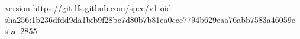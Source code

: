 version https://git-lfs.github.com/spec/v1
oid sha256:1b236dfdd9da1bfb9f28bc7d80b7b81ea0cce7794b629eaa76abb7583a46059e
size 2855

